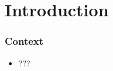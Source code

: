 \section{Introduction}

\begin{frame}
\frametitle{Context}


\begin{itemize}
	\item		???

\end{itemize}

\end{frame}






